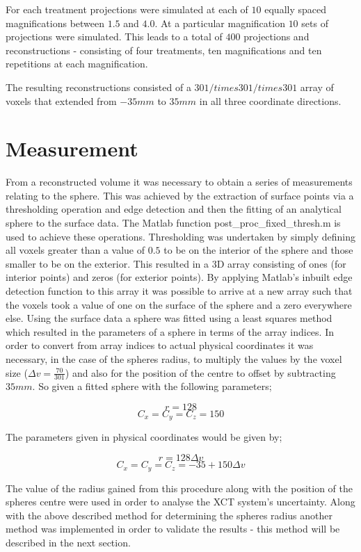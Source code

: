\documentclass[
  twoside,
  11pt, a4paper,
  footinclude=true,
  headinclude=true,
  cleardoublepage=empty
]{scrbook}
\begin{document}
For each treatment projections were simulated at each of $10$ equally spaced magnifications between $1.5$ and $4.0$. At a particular magnification $10$ sets of projections were simulated. This leads to a total of $400$ projections and reconstructions - consisting of four treatments, ten magnifications and ten repetitions at each magnification.

The resulting reconstructions consisted of a $301/times301/times301$ array of voxels that extended from $-35mm$ to $35mm$ in all three coordinate directions.

\section{Measurement}

From a reconstructed volume it was necessary to obtain a series of measurements relating to the sphere. This was achieved by the extraction of surface points via a thresholding operation and edge detection and then the fitting of an analytical sphere to the surface data. The Matlab function post\_proc\_fixed\_thresh.m is used to achieve these operations. Thresholding was undertaken by simply defining all voxels greater than a value of $0.5$ to be on the interior of the sphere and those smaller to be on the exterior. This resulted in a 3D array consisting of ones (for interior points) and zeros (for exterior points). By applying Matlab's inbuilt edge detection function to this array it was possible to arrive at a new array such that the voxels took a value of one on the surface of the sphere and a zero everywhere else. Using the surface data a sphere was fitted using a least squares method which resulted in the parameters of a sphere in terms of the array indices. In order to convert from array indices to actual physical coordinates it was necessary, in the case of the spheres radius, to multiply the values by the voxel size ($\Delta v = \frac{70}{301}$) and also for the position of the centre to offset by subtracting $35mm$. So given a fitted sphere with the following parameters;

\[
r = 128
\]
\[
C_x = C_y = C_z = 150
\]

The parameters given in physical coordinates would be given by;

\[
r = 128\Delta v
\]
\[
C_x = C_y = C_z = -35 + 150\Delta v
\]

The value of the radius gained from this procedure along with the position of the spheres centre were used in order to analyse the XCT system's uncertainty. Along with the above described method for determining the spheres radius another method was implemented in order to validate the results - this method will be described in the next section.
\end{document}

